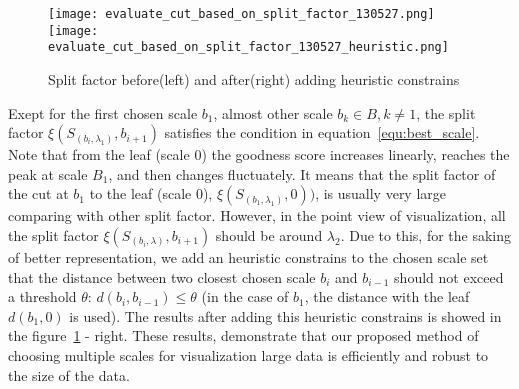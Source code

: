 \begin{figure}
  \centering
  \texttt{[image: evaluate\_cut\_based\_on\_split\_factor\_130527.png]}
  \texttt{[image: evaluate\_cut\_based\_on\_split\_factor\_130527\_heuristic.png]}
  \caption{Split factor before(left) and after(right) adding heuristic constrains}
  \label{fig:goodness_score}
\end{figure}

Exept for the first chosen scale $b_1$, almost other scale $b_k \in \mathsf{\textit{B}}, k \neq 1$, the split factor $\xi(S_{(b_i,\lambda_1)},b_{i+1})$ satisfies the condition in equation~\ref{equ:best_scale}. Note that from the leaf (scale $0$) the goodness score increases linearly, reaches the peak at scale $B_1$, and then changes fluctuately. It means that the split factor of the cut at $b_1$ to the leaf (scale $0$), $\xi(S_{(b_1,\lambda_1)},0))$, is usually very large comparing with other split factor. However, in the point view of visualization, all the split factor $\xi(S_{(b_i,\lambda)},b_{i+1})$ should be around $\lambda_2$. Due to this, for the saking of better representation, we add an heuristic constrains to the chosen scale set that the distance between two closest chosen scale $b_i$ and $b_{i-1}$ should not exceed a threshold $\theta$: $d(b_i,b_{i-1}) \leq \theta$ (in the case of $b_1$, the distance with the leaf $d(b_1,0)$ is used). The results after adding this heuristic constrains is showed in the figure~\ref{fig:goodness_score} - right. 
These results, demonstrate that our proposed method of choosing multiple scales for visualization large data is efficiently and robust to the size of the data. 


